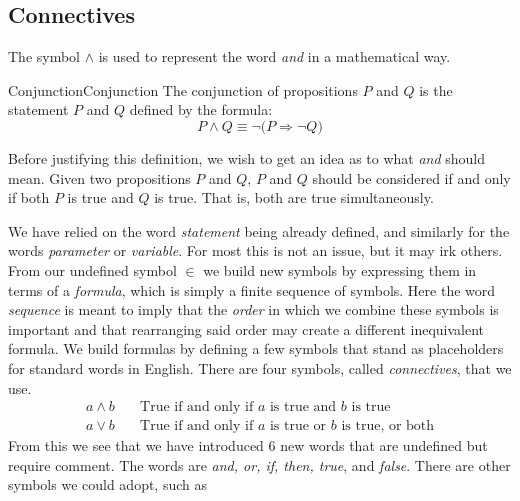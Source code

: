     \subsection{Connectives}
        The symbol $\land$ is used to represent the word \textit{and} in a
        mathematical way. 
        \begin{fdefinition}{Conjunction}{Conjunction}
            The conjunction of propositions $P$ and $Q$ is the statement $P$ and
            $Q$ defined by the formula:
            \begin{equation*}
                P\land{Q}\equiv\neg\big(P\Rightarrow\neg{Q}\big)
            \end{equation*}
        \end{fdefinition}
        Before justifying this definition, we wish to get an idea as to what
        \textit{and} should mean. Given two propositions $P$ and $Q$, $P$ and
        $Q$ should be considered if and only if both $P$ is true and $Q$ is
        true. That is, both are true simultaneously.
        \par\hfill\par
    We have relied on the word \textit{statement} being already defined, and
    similarly for the words \textit{parameter} or \textit{variable}. For most
    this is not an issue, but it may irk others. From our undefined symbol $\in$
    we build new symbols by expressing them in terms of a
    \textit{formula}, which is simply a finite
    sequence of symbols. Here the word \textit{sequence} is meant to imply that
    the \textit{order} in which we combine these symbols is important and that
    rearranging said order may create a different inequivalent formula. We build
    formulas by defining a few symbols that stand as placeholders for standard
    words in English. There are four symbols, called
    \textit{\glspl{connective}}, that we use.
    \begin{align*}
        a\land{b}\quad
        &\textrm{True if and only if }a
        \textrm{ is true and }b\textrm{ is true}
        \tag{Conjunction}\\
        a\lor{b}\quad
        &\textrm{True if and only if }a
        \textrm{ is true or }b\textrm{ is true, or both}
        \tag{Disjunction}
    \end{align*}
    From this we see that we have introduced 6 new words that are undefined but
    require comment. The words are \textit{and, or, if, then, true}, and
    \textit{false}. There are other symbols we could adopt, such as
